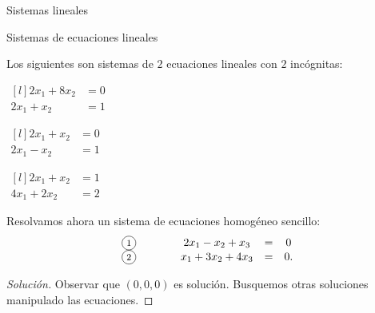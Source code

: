 \begin{chapter}{Sistemas lineales}
\begin{section}{Sistemas de ecuaciones lineales}
            \begin{ejemplo*}
                Los siguientes son sistemas de $2$ ecuaciones lineales con $2$ incógnitas:
                    \begin{enumerate}
                        \begin{minipage}{0.3\textwidth}
                        \item $\begin{matrix*}[l]
                            2x_1 + 8x_2 &= 0 &  \\
                            2x_1 + x_2 &=  1& 
                            \end{matrix*}$\end{minipage}
                            \begin{minipage}{0.3\textwidth}
                        \item $\begin{matrix*}[l]
                            2x_1 + x_2 &= 0 &  \\
                            2x_1 - x_2 &=  1& 
                            \end{matrix*}$\end{minipage}
                            \begin{minipage}{0.3\textwidth}
                        \item $ \begin{matrix*}[l]
                            2x_1 + x_2 &= 1 &  \\
                            4x_1 +2 x_2 &=  2& 
                            \end{matrix*}$\end{minipage}
                    \end{enumerate}
            \end{ejemplo*} 
            
            \begin{ejemplo}\label{ej-sist-1}
                Resolvamos ahora un sistema de ecuaciones homogéneo sencillo:
                \begin{equation*}
                \begin{matrix}
                \text{\footnotesize\circled{1}}&\qquad& 2x_1 -x_2 + x_3 &=& 0 \\
                \text{\footnotesize\circled{2}}&\qquad& x_1 + 3x_2 + 4x_3 &=& 0.
                \end{matrix}
                \end{equation*}
            \end{ejemplo}
            \begin{proof}[Solución]
                Observar que $(0,0,0)$ es solución. Busquemos otras soluciones manipulado las ecuaciones.


\end{proof}
\end{section}
\end{chapter}
